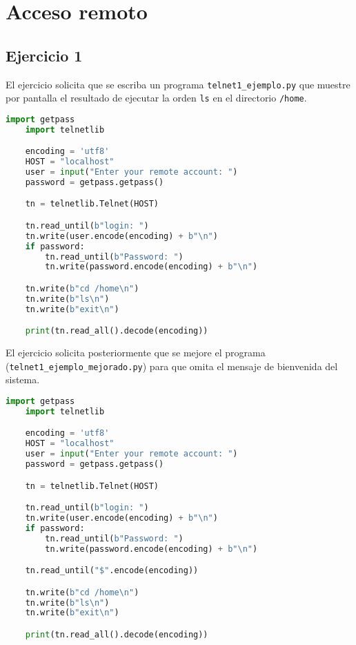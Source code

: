 
\section{Acceso remoto}
\subsection{Ejercicio 1}
El ejercicio solicita que se escriba un programa \lstinline{telnet1_ejemplo.py}
que muestre por pantalla el resultado de ejecutar la orden \lstinline{ls} en el
directorio \Verb#/home#.

\begin{lstlisting}[language=Python]
    import getpass
    import telnetlib

    encoding = 'utf8'
    HOST = "localhost"
    user = input("Enter your remote account: ")
    password = getpass.getpass()

    tn = telnetlib.Telnet(HOST)

    tn.read_until(b"login: ")
    tn.write(user.encode(encoding) + b"\n")
    if password:
        tn.read_until(b"Password: ")
        tn.write(password.encode(encoding) + b"\n")

    tn.write(b"cd /home\n")
    tn.write(b"ls\n")
    tn.write(b"exit\n")

    print(tn.read_all().decode(encoding))
\end{lstlisting}

El ejercicio solicita posteriormente que se mejore el programa \\
(\lstinline{telnet1_ejemplo_mejorado.py}) para que omita el mensaje de bienvenida
del sistema.

\begin{lstlisting}[language=Python]
    import getpass
    import telnetlib

    encoding = 'utf8'
    HOST = "localhost"
    user = input("Enter your remote account: ")
    password = getpass.getpass()

    tn = telnetlib.Telnet(HOST)

    tn.read_until(b"login: ")
    tn.write(user.encode(encoding) + b"\n")
    if password:
        tn.read_until(b"Password: ")
        tn.write(password.encode(encoding) + b"\n")

    tn.read_until("$".encode(encoding))

    tn.write(b"cd /home\n")
    tn.write(b"ls\n")
    tn.write(b"exit\n")

    print(tn.read_all().decode(encoding))
\end{lstlisting}

